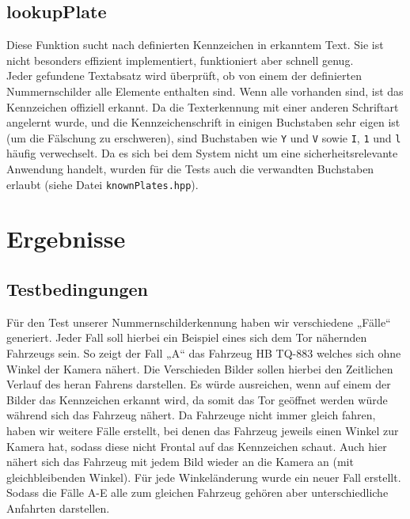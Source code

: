 \documentclass{../Vorlage/sebDenCls}
\begin{document}


\subsection{lookupPlate}
\label{lookupPlate}
Diese Funktion sucht nach definierten Kennzeichen in erkanntem Text. Sie ist nicht besonders effizient implementiert, funktioniert aber schnell genug.\\
Jeder gefundene Textabsatz wird überprüft, ob von einem der definierten Nummernschilder alle Elemente enthalten sind. Wenn alle vorhanden sind, ist das Kennzeichen offiziell erkannt. Da die Texterkennung mit einer anderen Schriftart angelernt wurde, und die Kennzeichenschrift in einigen Buchstaben sehr eigen ist (um die Fälschung zu erschweren), sind Buchstaben wie \texttt{Y} und \texttt{V} sowie \texttt{I}, \texttt{1} und \texttt{l} häufig verwechselt. Da es sich bei dem System nicht um eine sicherheitsrelevante Anwendung handelt, wurden für die Tests auch die verwandten Buchstaben erlaubt (siehe Datei \texttt{knownPlates.hpp}).


\section{Ergebnisse}
\subsection{Testbedingungen}
Für den Test unserer Nummernschilderkennung haben wir verschiedene „Fälle“ generiert. Jeder Fall soll hierbei ein Beispiel eines sich dem Tor nähernden Fahrzeugs sein. So zeigt der Fall „A“ das Fahrzeug HB TQ-883 welches sich ohne Winkel der Kamera nähert. Die Verschieden Bilder sollen hierbei den Zeitlichen Verlauf des heran Fahrens darstellen. Es würde ausreichen, wenn auf einem der Bilder das Kennzeichen erkannt wird, da somit das Tor geöffnet werden würde während sich das Fahrzeug nähert. Da Fahrzeuge nicht immer gleich fahren, haben wir weitere Fälle erstellt, bei denen das Fahrzeug jeweils einen Winkel zur Kamera hat, sodass diese nicht Frontal auf das Kennzeichen schaut. Auch hier nähert sich das Fahrzeug mit jedem Bild wieder an die Kamera an (mit gleichbleibenden Winkel). Für jede Winkeländerung wurde ein neuer Fall erstellt.
Sodass die Fälle A-E alle zum gleichen Fahrzeug gehören aber unterschiedliche Anfahrten darstellen.
\end{document}
